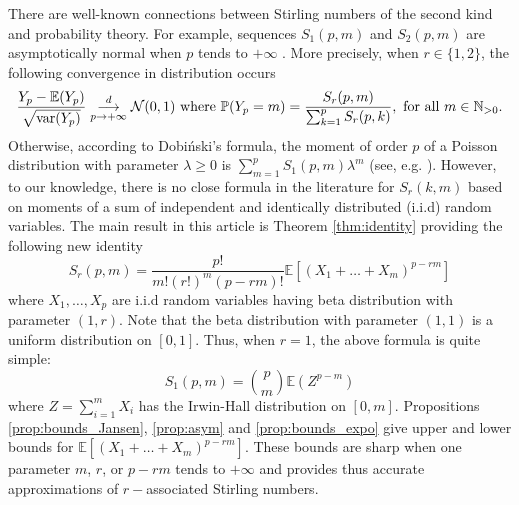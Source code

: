 \documentclass{article}
\theoremstyle{plain}
\newcommand{\N}{{\mathbb N}}
\newcommand{\E}{{\mathbb E}}
\renewcommand{\P}{{\mathbb P}}
\begin{document}
There are well-known connections between Stirling numbers of the second kind and probability theory. 
For example, sequences $S_1(p,m)$ and $S_2(p,m)$ are asymptotically  normal when $p$ tends to $+\infty$ \cite{har,czab}. More precisely,
when $r\in \{1,2\}$,  the following convergence in distribution occurs
\[\frac{Y_p-\E(Y_p)}{\sqrt{{\rm var}(Y_p)}}\overset{d}{\underset{p\to +\infty}{\longrightarrow}}\mathcal{N}(0,1)\text{ where } \P(Y_p=m)=\frac{S_r(p,m)}{\sum_{k=1}^{p}S_r(p,k)}, \text{ for all }m\in \N_{>0}.\] 
Otherwise, according to Dobiński's formula,
 the moment of order $p$ of a Poisson distribution with parameter $\lambda\ge 0$ is $\sum_{m=1}^{p}S_1(p,m)\lambda^m$ (see, e.g. \cite[p. 211]{comtet}). 
However, to our knowledge, there is no close formula in the literature for $S_r(k,m)$ based on moments of a sum of independent and identically distributed (i.i.d) random variables. The main result in this article is Theorem \ref{thm:identity} 
providing the following new identity
\begin{equation}\label{eq:id}
S_r(p,m)=\frac{p!}{m!(r!)^m(p-rm)!}
\E\left[\left(X_1+\dots+X_m\right)^{p-rm}\right]
\end{equation}
where $X_1,\dots,X_p$ are i.i.d random variables having beta distribution with parameter $(1,r)$. 
Note that the beta distribution with parameter $(1,1)$ is a uniform distribution on $[0,1]$. Thus, when $r=1$, 
the above formula  is quite simple:
\[S_1(p,m)=\binom{p}{m}
\E\left(Z^{p-m}\right)\] 
 where $Z=\sum_{i=1}^m X_i$ has the Irwin-Hall distribution on $[0,m]$. 
Propositions \ref{prop:bounds_Jansen}, 
\ref{prop:asym} and \ref{prop:bounds_expo} give  upper and lower bounds for  $\E\left[\left(X_1+\dots+X_m\right)^{p-rm}\right]$. These bounds are sharp when one parameter $m$, $r$, or $p-rm$ tends to $+\infty$ and provides thus accurate approximations of $r-$associated Stirling numbers. 
\end{document}
